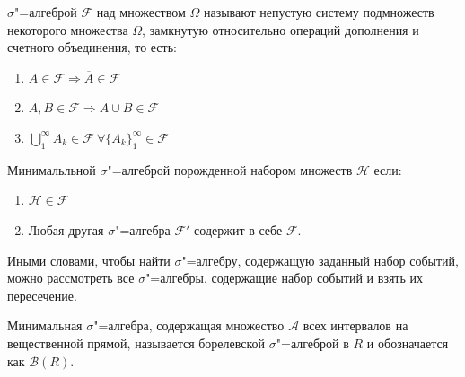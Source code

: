 \begin{definition}[$\sigma$"=алгебра над множеством]
    $\sigma$"=алгеброй $\mathcal{F}$ над множеством $\Omega$ называют непустую систему подмножеств некоторого множества $\Omega$, 
    замкнутую относительно операций дополнения и счетного объединения, то есть:
    \begin{enumerate}
        \item $A \in \mathcal{F} \Rightarrow \overline{A} \in \mathcal{F}$
        \item $A, B \in \mathcal{F} \Rightarrow A \cup B \in \mathcal{F}$
        \item $\displaystyle \bigcup\limits_1^{\infty}A_k \in \mathcal{F} ~\forall {\{A_k\}}_1^\infty \in \mathcal{F}$
    \end{enumerate}
\end{definition}

\begin{definition}[Минимальная $\sigma$"=алгебра]
    Минимальльной $\sigma$"=алгеброй порожденной набором множеств $\mathcal{H}$
    если:
    \begin{enumerate}
        \item $\mathcal{H} \in \mathcal{F}$
        \item Любая другая $\sigma$"=алгебра $\mathcal{F'}$ содержит в себе $\mathcal{F}$.
    \end{enumerate}
    Иными словами, чтобы найти $\sigma$"=алгебру, содержащую заданный набор
    событий, можно рассмотреть все $\sigma$"=алгебры, содержащие набор
    событий и взять их пересечение.
\end{definition}

\begin{definition}[Борелевская $\sigma$"=алгебра]
    Минимальная $\sigma$"=алгебра, содержащая множество $\mathcal{A}$ всех интервалов
    на вещественной прямой, называется борелевской $\sigma$"=алгеброй в $R$ и обозначается
    как $\mathcal{B}(R)$.
\end{definition}

